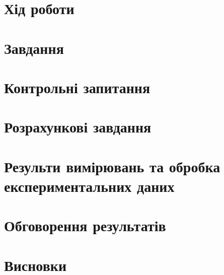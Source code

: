 \section{Хід роботи}



\section{Завдання}


\section{Контрольні запитання}



\section{Розрахункові завдання}




\section{Результи вимірювань та обробка експериментальних даних}


\section{Обговорення результатів}


\section*{Висновки}


